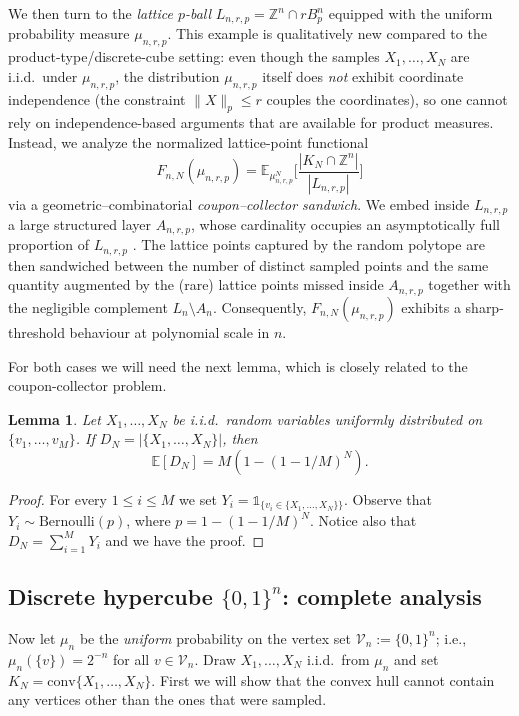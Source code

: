 \documentclass[11pt,a4paper]{article} %
\newtheorem{lemma}[theorem]{Lemma}
\theoremstyle{definition}
\theoremstyle{remark}
\newcommand{\E}{\mathbb{E}}
\newcommand{\Z}{\mathbb{Z}}
\newcommand{\conv}{\mathrm{conv}}
\newcommand{\1}{\mathds{1}}
\begin{document}
We then turn to the \emph{lattice $p$-ball} $L_{n,r,p}=\Z^n\cap rB_p^n$ equipped with the uniform probability measure $\mu_{n,r,p}$.
This example is qualitatively new compared to the product-type/discrete-cube setting:
even though the samples $X_1,\dots,X_N$ are i.i.d.\ under $\mu_{n,r,p}$, the distribution $\mu_{n,r,p}$ itself
does \emph{not} exhibit coordinate independence (the constraint $\|X\|_p\le r$ couples the coordinates),
so one cannot rely on independence-based arguments that are available for product measures.
Instead, we analyze the normalized lattice-point functional
\[
F_{n,N}(\mu_{n,r,p})=\E_{\mu_{n,r,p}^N}\Big[\frac{|K_N\cap \Z^n|}{|L_{n,r,p}|}\Big]
\]
via a geometric--combinatorial \emph{coupon--collector sandwich}. We embed inside $L_{n,r,p}$ a large structured layer $A_{n,r,p}$,
whose cardinality 
occupies an asymptotically full
proportion of $L_{n,r,p}$ . The lattice points captured by the
random polytope are then sandwiched between the number of distinct sampled points and the
same quantity augmented by the (rare) lattice points missed inside $A_{n,r,p}$ together with the
negligible complement $L_n\setminus A_n$. Consequently, $F_{n,N}(\mu_{n,r,p})$ exhibits a sharp-threshold behaviour at polynomial scale in $n$.


For both cases we will need the next lemma, which is closely related to the coupon-collector problem.

\begin{lemma}\label{lem:coupon-collector}
    Let $X_1,\ldots,X_N$ be i.i.d.\ random variables uniformly distributed on
$\{v_1,\ldots,v_M\}$. If $D_N= | \{X_1,\ldots,X_N\}|$, then $$\E[D_N]=M(1-(1-1/M)^N).$$
\end{lemma}

\begin{proof}
    For every $1 \leq i \leq M$ we set $Y_i=\mathds{1}_{\{v_i \in \{X_1,\ldots,X_N\} \}}$. Observe that $Y_i \sim \text{Bernoulli}(p)$, where $p=1-(1-1/M)^N$. Notice also that $D_N=\sum_{i=1}^M Y_i$ and we have the proof.
\end{proof}


\subsection{Discrete hypercube $\{0,1\}^n$: complete analysis}

Now let $\mu_n$ be the \emph{uniform } probability on the vertex set
$\mathcal{V}_n:=\{0,1\}^n$; i.e., $\mu_n(\{v\})=2^{-n}$ for all $v\in\mathcal{V}_n$.
Draw $X_1,\dots,X_N$ i.i.d.\ from $\mu_n$  and set $K_N=\conv\{X_1,\dots,X_N\}$. First we will show that the convex hull cannot contain any vertices other than the ones that were sampled.
\end{document}
